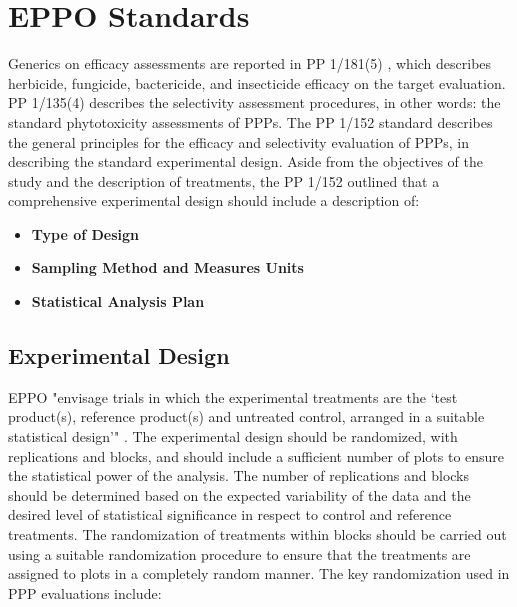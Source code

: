 \documentclass[12pt,a4paper,oneside]{report}
\begin{document}
\section{EPPO Standards}

Generics on efficacy assessments are reported in PP 1/181(5) \cite{EPPO_PP1_181}, which describes
herbicide, fungicide, bactericide, and insecticide efficacy on the target evaluation.
PP 1/135(4) \cite{EPPO_PP1_135} describes the selectivity assessment procedures, 
in other words: the standard phytotoxicity assessments of PPPs.
The PP 1/152 \cite{EPPO_PP1_152} standard describes the general principles for the
efficacy and selectivity evaluation of PPPs, in describing the standard experimental design.
Aside from the objectives of the study and the description of treatments, 
the PP 1/152 outlined that a comprehensive experimental design should include a description of:
\begin{itemize}
    \item \textbf{Type of Design}
    \item \textbf{Sampling Method and Measures Units}
    \item \textbf{Statistical Analysis Plan}
\end{itemize}

\subsection{Experimental Design}

EPPO "envisage trials in which the experimental
treatments are the ‘test product(s), reference product(s) and
untreated control, arranged in a suitable statistical design’" \cite{EPPO_PP1_152}.
The experimental design should be randomized, with replications and blocks, and
should include a sufficient number of plots to ensure the statistical power of the
analysis. The number of replications and blocks should be determined based on the
expected variability of the data and the desired level of statistical significance
in respect to control and reference treatments. The
randomization of treatments within blocks should be carried out using a suitable
randomization procedure to ensure that the treatments are assigned to plots in a
completely random manner. The key randomization used in PPP 
evaluations include:
\end{document}
